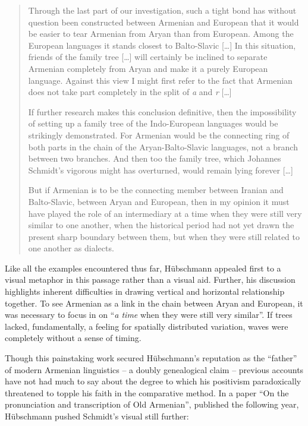 \documentclass[output=paper]{langscibook}
\begin{document}
\begin{quotation}
Through the last part of our investigation, such a tight bond has without question been constructed between Armenian and European that it would be easier to tear Armenian from Aryan than from European. Among the European languages it stands closest to Balto-Slavic […] In this situation, friends of the family tree […] will certainly be inclined to separate Armenian completely from Aryan and make it a purely European language. Against this view I might first refer to the fact that Armenian does not take part completely in the split of \emph{a} and \emph{r} […] 

If further research makes this conclusion definitive, then the impossibility of setting up a family tree of the Indo-European languages would be strikingly demonstrated. For Armenian would be the connecting ring of both parts in the chain of the Aryan-Balto-Slavic languages, not a branch between two branches. And then too the family tree, which Johannes Schmidt's vigorous might has overturned, would remain lying forever […] 

But if Armenian is to be the connecting member between Iranian and Balto-Slavic, between Aryan and European, then in my opinion it must have played the role of an intermediary at a time when they were still very similar to one another, when the historical period had not yet drawn the present sharp boundary between them, but when they were still related to one another as dialects. \citep[183]{Huebschmann1875}
\end{quotation}

Like all the examples encountered thus far, Hübschmann appealed first to a visual metaphor in this passage rather than a visual aid. Further, his discussion highlights inherent difficulties in drawing vertical and horizontal relationship together. To see Armenian as a link in the chain between Aryan and European, it was necessary to focus in on ``\emph{a time} when they were still very similar''. If trees lacked, fundamentally, a feeling for spatially distributed variation, waves were completely without a sense of timing.

Though this painstaking work secured Hübschmann's reputation as the ``father'' of modern Armenian linguistics – a doubly genealogical claim – previous accounts have not had much to say about the degree to which his positivism paradoxically threatened to topple his faith in the comparative method. In a paper ``On the pronunciation and transcription of Old Armenian'', published the following year, Hübschmann pushed Schmidt's visual still further:
\end{document}
